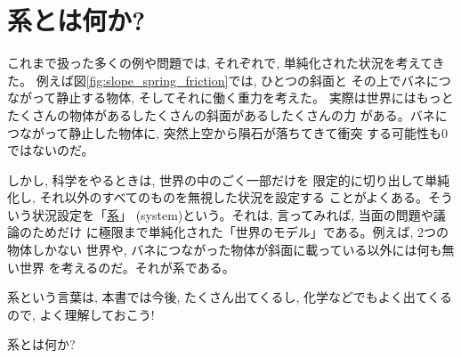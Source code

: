 \section{系とは何か?}

これまで扱った多くの例や問題では, それぞれで, 単純化された状況を考えてきた。
例えば図\ref{fig:slope_spring_friction}では, ひとつの斜面と
その上でバネにつながって静止する物体, そしてそれに働く重力を考えた。
実際は世界にはもっとたくさんの物体があるしたくさんの斜面があるしたくさんの力
がある。バネにつながって静止した物体に, 突然上空から隕石が落ちてきて衝突
する可能性も0ではないのだ。

しかし, 科学をやるときは, 世界の中のごく一部だけを
限定的に切り出して単純化し, それ以外のすべてのものを無視した状況を設定する
ことがよくある。そういう状況設定を「\underline{系}」
(system)という。それは, 言ってみれば, 当面の問題や議論のためだけ
に極限まで単純化された「世界のモデル」である。例えば, 2つの物体しかない
世界や, バネにつながった物体が斜面に載っている以外には何も無い世界
を考えるのだ。それが系である。

系という言葉は, 本書では今後, たくさん出てくるし, 化学などでもよく出てくるので, 
よく理解しておこう!\mv

\begin{q}\label{q:whatissystem} 系とは何か?\end{q}
\hv




